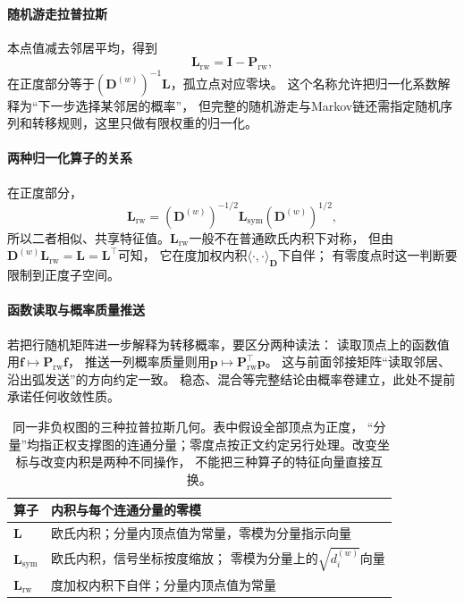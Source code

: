 \paragraph{随机游走拉普拉斯}
本点值减去邻居平均，得到
\[
  \bm L_{\mathrm{rw}}=\bm I-\bm P_{\mathrm{rw}},
\]
在正度部分等于$(\bm D^{(w)})^{-1}\bm L$，孤立点对应零块。
这个名称允许把归一化系数解释为“下一步选择某邻居的概率”，
但完整的随机游走与Markov链还需指定随机序列和转移规则，这里只做有限权重的归一化。

\paragraph{两种归一化算子的关系}
在正度部分，
\[
  \bm L_{\mathrm{rw}}
  =(\bm D^{(w)})^{-1/2}\bm L_{\mathrm{sym}}(\bm D^{(w)})^{1/2},
\]
所以二者相似、共享特征值。$\bm L_{\mathrm{rw}}$一般不在普通欧氏内积下对称，
但由$\bm D^{(w)}\bm L_{\mathrm{rw}}=\bm L=\bm L^\top$可知，
它在度加权内积$\langle\cdot,\cdot\rangle_{\bm D}$下自伴；
有零度点时这一判断要限制到正度子空间。

\paragraph{函数读取与概率质量推送}
若把行随机矩阵进一步解释为转移概率，要区分两种读法：
读取顶点上的函数值用$\bm f\mapsto\bm P_{\mathrm{rw}}\bm f$，
推送一列概率质量则用$\bm p\mapsto\bm P_{\mathrm{rw}}^\top\bm p$。
这与前面邻接矩阵“读取邻居、沿出弧发送”的方向约定一致。
稳态、混合等完整结论由概率卷建立，此处不提前承诺任何收敛性质。

\begin{table}[htbp]
  \centering\small
  \begin{tabularx}{\linewidth}{@{}lX@{}}
    \toprule
    算子 & 内积与每个连通分量的零模\\
    \midrule
    $\bm L$ & 欧氏内积；分量内顶点值为常量，零模为分量指示向量\\
    $\bm L_{\mathrm{sym}}$ & 欧氏内积，信号坐标按度缩放；
      零模为分量上的$\sqrt{d_i^{(w)}}$向量\\
    $\bm L_{\mathrm{rw}}$ & 度加权内积下自伴；分量内顶点值为常量\\
    \bottomrule
  \end{tabularx}
  \caption{同一非负权图的三种拉普拉斯几何。表中假设全部顶点为正度，
  “分量”均指正权支撑图的连通分量；零度点按正文约定另行处理。改变坐标与改变内积是两种不同操作，
  不能把三种算子的特征向量直接互换。}
  \label{tab:graph-theory-laplacian-geometries}
\end{table}

